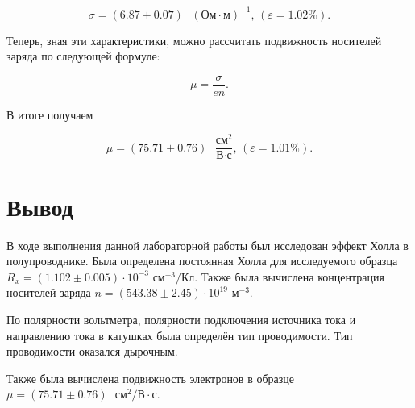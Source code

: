 \documentclass[a4paper,12pt]{article} %
\begin{document}
\begin{equation}\label{12}
\boxed{\sigma = (6.87\pm0.07)\text{ } (\text{Ом}\cdot\text{м})^{-1}}  \text{, }(\varepsilon = 1.02 \%). 
\end{equation}

Теперь, зная эти характеристики, можно рассчитать подвижность носителей заряда по следующей формуле:

\begin{equation}\label{13}
\mu=\frac{\sigma}{en}.
\end{equation}

В итоге получаем

\begin{equation}\label{14}
\boxed{\mu = (75.71\pm0.76) \text{ } \frac{\text{см}^2}{\text{В}\cdot\text{с}}}  \text{, }(\varepsilon = 1.01 \%). 
\end{equation}

\section{Вывод}

В ходе выполнения данной лабораторной работы был исследован эффект Холла в полупроводнике. Была определена постоянная Холла для исследуемого образца $ R_x = (1.102\pm0.005) \cdot 10^{-3} \text{ см}^{-3}/\text{Кл} $. Также была вычислена концентрация носителей заряда $ n = (543.38\pm2.45) \cdot 10^{19} \text{ м}^{-3}. $

По полярности вольтметра, полярности подключения источника тока и направлению тока в катушках была определён тип проводимости. Тип проводимости оказался дырочным.

Также была вычислена подвижность электронов в образце $ \mu = (75.71\pm0.76) \text{ } \text{см}^2/\text{В}\cdot\text{с} $. 
\end{document}
